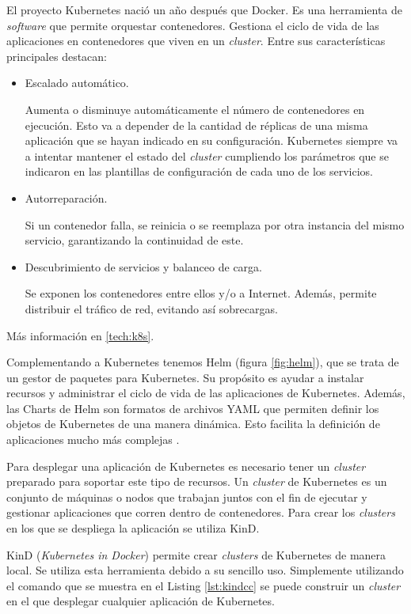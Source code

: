 El proyecto Kubernetes nació un año después que Docker. Es una herramienta de \textit{software} que permite orquestar contenedores. Gestiona el ciclo de vida de las aplicaciones en contenedores que viven en un \textit{cluster}. Entre sus características principales destacan:

\begin{itemize}
  \item Escalado automático.

    Aumenta o disminuye automáticamente el número de contenedores en ejecución. Esto va a depender de la cantidad de réplicas de una misma aplicación que se hayan indicado en su configuración. Kubernetes siempre va a intentar mantener el estado del \textit{cluster} cumpliendo los parámetros que se indicaron en las plantillas de configuración de cada uno de los servicios.

  \item Autorreparación.

    Si un contenedor falla, se reinicia o se reemplaza por otra instancia del mismo servicio, garantizando la continuidad de este.

  \item Descubrimiento de servicios y balanceo de carga.

    Se exponen los contenedores entre ellos y/o a Internet. Además, permite distribuir el tráfico de red, evitando así sobrecargas.
\end{itemize}

Más información en \ref{tech:k8s}.

Complementando a Kubernetes tenemos Helm (figura \ref{fig:helm}), que se trata de un gestor de paquetes para Kubernetes. Su propósito es ayudar a instalar recursos y administrar el ciclo de vida de las aplicaciones de Kubernetes. Además, las Charts de Helm son formatos de archivos YAML que permiten definir los objetos de Kubernetes de una manera dinámica. Esto facilita la definición de aplicaciones mucho más complejas .

Para desplegar una aplicación de Kubernetes es necesario tener un \textit{cluster} preparado para soportar este tipo de recursos. Un \textit{cluster} de Kubernetes es un conjunto de máquinas o nodos que trabajan juntos con el fin de ejecutar y gestionar aplicaciones que corren dentro de contenedores. Para crear los \textit{clusters} en los que se despliega la aplicación se utiliza KinD\cite{kind}.

KinD (\textit{Kubernetes in Docker}) permite crear \textit{clusters} de Kubernetes de manera local. Se utiliza esta herramienta debido a su sencillo uso. Simplemente utilizando el comando que se muestra en el Listing \ref{lst:kindcc} se puede construir un \textit{cluster} en el que desplegar cualquier aplicación de Kubernetes.

